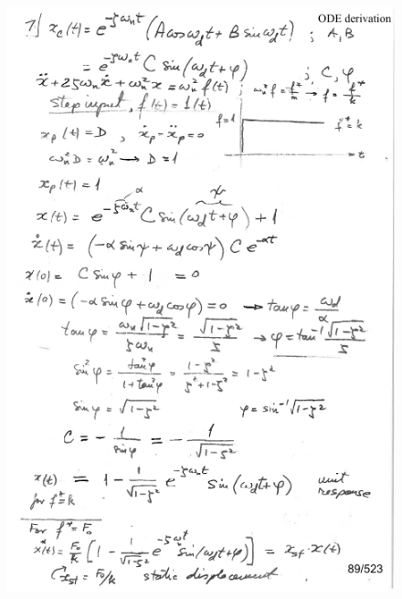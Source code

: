 \documentclass[12pt,letter]{article}
\begin{document}
\begin{mdframed}[middlelinewidth=0.5mm]
	\begin{center}
	\end{center}

\begin{figure}[H]
	\centering
	\includegraphics[width=5.5in]{../figures/x_t_time_response_2nd_order_step_proof_1}
\end{figure}
\begin{figure}[H]
	\centering

\end{figure}
\end{mdframed}
\end{document}

